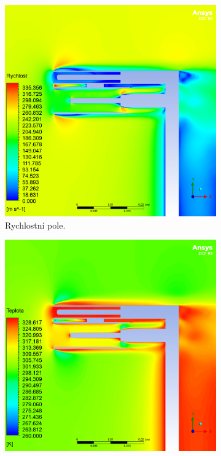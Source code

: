             \begin{figure}[ht!]
                \centering
                \begin{subfigure}{0.45\textwidth}
                    \centering
                    \captionsetup{width=.9\linewidth}
                    \includegraphics[width=\textwidth]{400_SIMULACE_KONSTRUKCNICH_UPRAV/Vizualizace/sonda_s_rozsirenym_stinenim_B_vizualizace_rychlost.png}
                    \caption{Rychlostní pole.}
                \end{subfigure}
                \begin{subfigure}{0.45\textwidth}
                    \centering
                    \captionsetup{width=.9\linewidth}
                    \includegraphics[width=\textwidth]{400_SIMULACE_KONSTRUKCNICH_UPRAV/Vizualizace/sonda_s_rozsirenym_stinenim_B_vizualizace_teplota.png}

\end{subfigure}
\end{figure}
